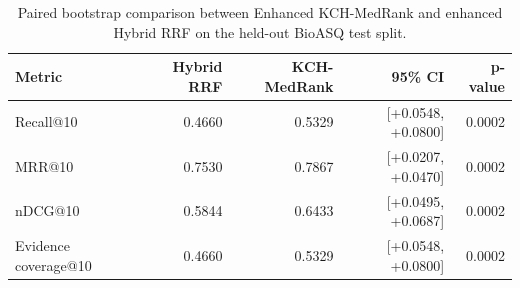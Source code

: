 \begin{table}[t]
\centering
\small
\caption{Paired bootstrap comparison between Enhanced KCH-MedRank and enhanced Hybrid RRF on the held-out BioASQ test split.}
\label{tab:enhanced-bioasq-bootstrap-hybrid}
\begin{tabular}{lrrrr}
\toprule
Metric & Hybrid RRF & KCH-MedRank & 95\% CI & p-value \\
\midrule
Recall@10 & 0.4660 & 0.5329 & [+0.0548, +0.0800] & 0.0002 \\
MRR@10 & 0.7530 & 0.7867 & [+0.0207, +0.0470] & 0.0002 \\
nDCG@10 & 0.5844 & 0.6433 & [+0.0495, +0.0687] & 0.0002 \\
Evidence coverage@10 & 0.4660 & 0.5329 & [+0.0548, +0.0800] & 0.0002 \\
\bottomrule
\end{tabular}
\end{table}
